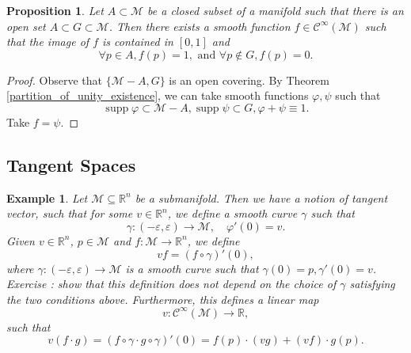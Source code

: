 \documentclass[8pt]{article}
\newtheorem{proposition}{Proposition}[section]
\newtheorem{example}{Example}[section]
\DeclareMathOperator{\supp}{supp}
\newcommand{\R}[0]{\mathbb{R}}
\begin{document}
\begin{proposition}
  Let $A\subset\mathcal{M}$ be a closed subset of a manifold such that there is an open set $A\subset G\subset \mathcal{M}$. Then there exists a smooth function $f\in\mathcal{C}^\infty(\mathcal{M})$ such that the image of $f$ is contained in $[0,1]$ and
  \begin{equation*}
    \forall p\in A, f(p) = 1,\text{ and }\forall p\not\in G, f(p) = 0.
  \end{equation*}
\end{proposition}

\begin{proof}
Observe that $\{\mathcal{M}-A,G\}$ is an open covering. By Theorem \ref{partition_of_unity_existence}, we can take smooth functions $\varphi,\psi$ such that 
\begin{equation*}
  \supp\varphi\subset\mathcal{M}-A,\supp\psi\subset G, \varphi+\psi \equiv 1.
\end{equation*}
Take $f = \psi$.
\end{proof}
\subsection{Tangent Spaces}
\begin{example}
  Let $\mathcal{M}\subseteq\R^n$ be a submanifold. Then we have a notion of tangent vector, such that for some $v\in\R^n$, we define a smooth curve $\gamma$ such that 
  \begin{equation*}
    \gamma:(-\varepsilon,\varepsilon)\to\mathcal{M},\quad \varphi'(0) = v.
  \end{equation*}
  Given $v\in\R^n$, $p\in\mathcal{M}$ and $f:\mathcal{M}\to\R^n$, we define 
  \begin{equation*}
    vf = (f\circ \gamma)'(0),
  \end{equation*}
  where $\gamma:(-\varepsilon,\varepsilon)\to\mathcal{M}$ is a smooth curve such that $\gamma(0)=p,\gamma'(0)= v$. 
  Exercise : show that this definition does not depend on the choice of $\gamma$ satisfying the two conditions above. Furthermore, this defines a linear map 
  \begin{equation*}
    v:\mathcal{C}^\infty(\mathcal{M})\to\R,
  \end{equation*}
  such that 
  \begin{equation*}
    v(f\cdot g) = (f\circ\gamma\cdot g\circ\gamma)'(0) = f(p)\cdot (vg)+(vf)\cdot g(p).
  \end{equation*}
\end{example}
\end{document}
